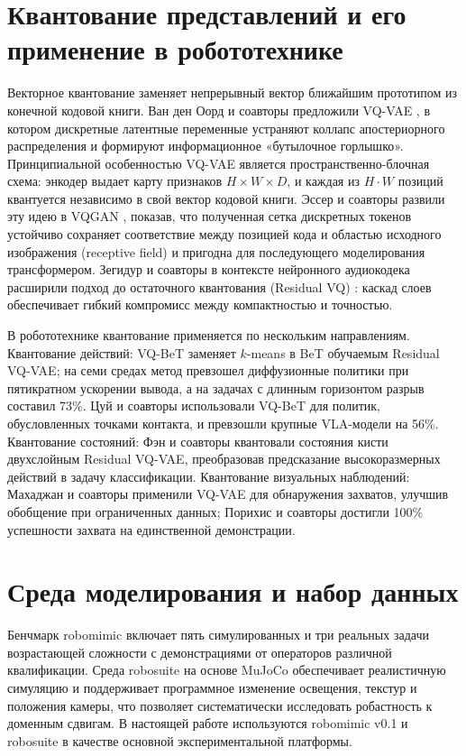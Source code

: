 \section{Квантование представлений и его применение в робототехнике}

Векторное квантование заменяет непрерывный вектор ближайшим прототипом из конечной кодовой книги. Ван ден Оорд и соавторы предложили VQ-VAE \cite{vandeoord2017neural}, в котором дискретные латентные переменные устраняют коллапс апостериорного распределения и формируют информационное «бутылочное горлышко». Принципиальной особенностью VQ-VAE является пространственно-блочная схема: энкодер выдает карту признаков $H{\times}W{\times}D$, и каждая из $H{\cdot}W$ позиций квантуется независимо в свой вектор кодовой книги. Эссер и соавторы развили эту идею в VQGAN \cite{esser2021taming}, показав, что полученная сетка дискретных токенов устойчиво сохраняет соответствие между позицией кода и областью исходного изображения (receptive field) и пригодна для последующего моделирования трансформером. Зегидур и соавторы в контексте нейронного аудиокодека расширили подход до остаточного квантования (Residual VQ) \cite{zeghidour2021soundstream}: каскад слоев обеспечивает гибкий компромисс между компактностью и точностью.

В робототехнике квантование применяется по нескольким направлениям. Квантование действий: VQ-BeT \cite{lee2024vqbet} заменяет $k$-means в BeT обучаемым Residual VQ-VAE; на семи средах метод превзошел диффузионные политики при пятикратном ускорении вывода, а на задачах с длинным горизонтом разрыв составил 73\%. Цуй и соавторы \cite{cui2026contact} использовали VQ-BeT для политик, обусловленных точками контакта, и превзошли крупные VLA-модели на 56\%. Квантование состояний: Фэн и соавторы \cite{feng2025learning} квантовали состояния кисти двухслойным Residual VQ-VAE, преобразовав предсказание высокоразмерных действий в задачу классификации. Квантование визуальных наблюдений: Махаджан и соавторы \cite{mahajan2020robotic} применили VQ-VAE для обнаружения захватов, улучшив обобщение при ограниченных данных; Порихис и соавторы \cite{porichis2024imitation} достигли 100\% успешности захвата на единственной демонстрации.

\section{Среда моделирования и набор данных}

Бенчмарк robomimic \cite{mandlekar2021robomimic} включает пять симулированных и три реальных задачи возрастающей сложности с демонстрациями от операторов различной квалификации. Среда robosuite на основе MuJoCo обеспечивает реалистичную симуляцию и поддерживает программное изменение освещения, текстур и положения камеры, что позволяет систематически исследовать робастность к доменным сдвигам. В настоящей работе используются robomimic v0.1 и robosuite в качестве основной экспериментальной платформы.

